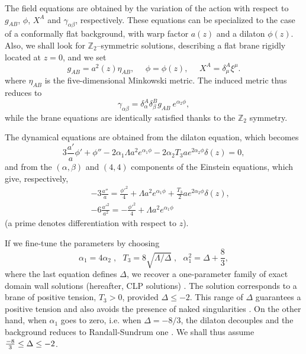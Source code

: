\documentclass[a4paper,12pt]{article}
\begin{document}
The field equations are obtained by the variation of the action
with respect to $g_{AB}$, $\phi$, $X^A$ and
$\gamma_{\alpha\beta}$, respectively. These equations can be
specialized to the case of a conformally flat background, with
warp factor $a(z)$ and a dilaton $\phi(z)$. Also, we shall look
for $\mathbb{Z}_2$--symmetric solutions, describing a flat brane
rigidly located at $z=0$, and we set
\begin{equation}
g_{AB}= a^2(z)\eta_{AB}, ~~~~~~ \phi = \phi(z), ~~~~~~ X^A =
\delta^A_\mu\xi^\mu. \label{26}
\end{equation}
where $\eta_{AB}$ is the five-dimensional Minkowski metric. The
induced metric thus reduces to
\begin{equation}
\gamma_{\alpha \beta} = \delta^A_\alpha \delta^B_\beta g_{AB}~
e^{\alpha_2 \phi},
\end{equation}
while the brane equations are identically satisfied thanks to the
$\mathbb{Z}_2$ symmetry.

The dynamical equations are obtained from the dilaton equation,
which becomes
\begin{equation}
3\frac{a'}{a}\phi'+\phi''-2\alpha_1 \Lambda a^2 e^{\alpha_1
\phi}-2\alpha_2 T_3 a e^{2\alpha_2 \phi} \delta(z)=0 , \label{Eq
reduced dilaton}
\end{equation}
and from the $(\alpha,\beta)$ and $(4,4)$ components of the
Einstein equations, which give, respectively,
\begin{eqnarray}
 && -3\frac{a''}{a} =\frac{\phi'^2}{4}+\Lambda a^2
e^{\alpha_1 \phi}+\frac{T_3}{2}a e^{2\alpha_2 \phi} \delta(z),
\label{Eq G00}\\ && -6\frac{a'^2}{a^2} =
-\frac{\phi'^2}{4}+\Lambda a^2 e^{\alpha_1 \phi}
 \label{Eq G44}
\end{eqnarray}
(a prime denotes differentiation with respect to $z$).

If we fine-tune the parameters by choosing
\begin{equation}
\alpha_1= 4 \alpha_2 \;,~~~ T_3 = 8 \sqrt{\Lambda/\Delta}\;,~~~
\alpha_1^2=\Delta+\frac{8}{3}, \label{alpha rel}
\end{equation}
where the last equation defines $\Delta$, we recover a
one-parameter family of exact domain wall solutions (hereafter,
CLP solutions) \cite{CLP}. The solution corresponds to a brane of
positive tension, $T_3>0$, provided $\Delta \leq -2$. This range
of $\Delta$ guarantees a positive tension and also avoids the
presence of naked singularities \cite{CLP}. On the other hand,
when $\alpha_1$ goes to zero, i.e. when $\Delta = -8/3$, the
dilaton decouples and the background reduces to Randall-Sundrum
one \cite{RS2}. We shall thus assume${-8\over 3} \leq \Delta \leq
-2$.
\end{document}
